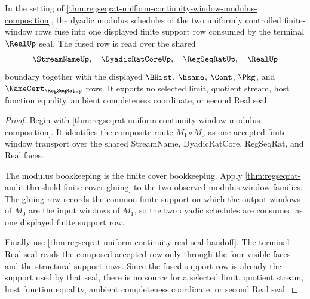\begin{theorem}
\label{thm:regseqrat-uniform-continuity-modulus-fusion}
In the setting of
\autoref{thm:regseqrat-uniform-continuity-window-modulus-composition}, the
dyadic modulus schedules of the two uniformly controlled finite-window rows fuse
into one displayed finite support row consumed by the terminal $\RealUp$ seal.
The fused row is read over the shared
$$
\StreamNameUp,\quad \DyadicRatCoreUp,\quad \RegSeqRatUp,\quad \RealUp
$$
boundary together with the displayed $\BHist$, $\hsame$, $\Cont$, $\Pkg$, and
$\NameCert_{\RegSeqRatUp}$ rows. It exports no selected limit, quotient stream,
host function equality, ambient completeness coordinate, or second Real seal.
\end{theorem}
\begin{proof}
Begin with
\autoref{thm:regseqrat-uniform-continuity-window-modulus-composition}. It
identifies the composite route $M_1 \circ M_0$ as one accepted finite-window
transport over the shared StreamName, DyadicRatCore, RegSeqRat, and Real faces.

The modulus bookkeeping is the finite cover bookkeeping. Apply
\autoref{thm:regseqrat-audit-threshold-finite-cover-gluing} to the two observed
modulus-window families. The gluing row records the common finite support on
which the output windows of $M_0$ are the input windows of $M_1$, so the two
dyadic schedules are consumed as one displayed finite support row.

Finally use \autoref{thm:regseqrat-uniform-continuity-real-seal-handoff}. The
terminal Real seal reads the composed accepted row only through the four visible
faces and the structural support rows. Since the fused support row is already
the support used by that seal, there is no source for a selected limit, quotient
stream, host function equality, ambient completeness coordinate, or second Real
seal.
\end{proof}

